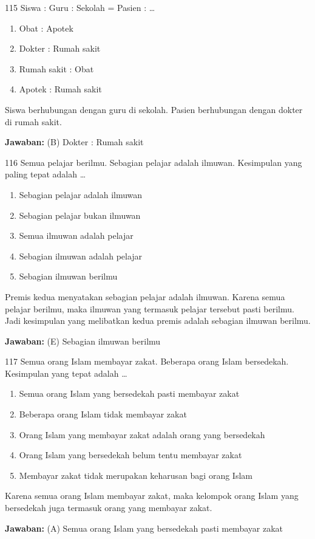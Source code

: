 \documentclass[11pt]{article}
\newenvironment{pil}{\begin{enumerate}[label=(\Alph*),leftmargin=*,itemsep=1pt,topsep=3pt]}{\end{enumerate}}
\newcommand{\jw}[1]{\par\smallskip\begin{jawbox}\textbf{Jawaban:} #1\end{jawbox}}
\begin{document}
\begin{soalbox}{1}{15}
Siswa : Guru : Sekolah = Pasien : \ldots
\begin{pil}\item Obat : Apotek \item Dokter : Rumah sakit \item Rumah sakit : Obat \item Apotek : Rumah sakit\end{pil}
\end{soalbox}
\begin{pembox}
Siswa berhubungan dengan guru di sekolah. Pasien berhubungan dengan dokter di rumah sakit.
\jw{(B) Dokter : Rumah sakit}
\end{pembox}

\begin{soalbox}{1}{16}
Semua pelajar berilmu. Sebagian pelajar adalah ilmuwan. Kesimpulan yang paling tepat adalah \ldots
\begin{pil}\item Sebagian pelajar adalah ilmuwan \item Sebagian pelajar bukan ilmuwan \item Semua ilmuwan adalah pelajar \item Sebagian ilmuwan adalah pelajar \item Sebagian ilmuwan berilmu\end{pil}
\end{soalbox}
\begin{pembox}
Premis kedua menyatakan sebagian pelajar adalah ilmuwan. Karena semua pelajar berilmu, maka ilmuwan yang termasuk pelajar tersebut pasti berilmu. Jadi kesimpulan yang melibatkan kedua premis adalah sebagian ilmuwan berilmu.
\jw{(E) Sebagian ilmuwan berilmu}
\end{pembox}

\begin{soalbox}{1}{17}
Semua orang Islam membayar zakat. Beberapa orang Islam bersedekah. Kesimpulan yang tepat adalah \ldots
\begin{pil}\item Semua orang Islam yang bersedekah pasti membayar zakat \item Beberapa orang Islam tidak membayar zakat \item Orang Islam yang membayar zakat adalah orang yang bersedekah \item Orang Islam yang bersedekah belum tentu membayar zakat \item Membayar zakat tidak merupakan keharusan bagi orang Islam\end{pil}
\end{soalbox}
\begin{pembox}
Karena semua orang Islam membayar zakat, maka kelompok orang Islam yang bersedekah juga termasuk orang yang membayar zakat.
\jw{(A) Semua orang Islam yang bersedekah pasti membayar zakat}
\end{pembox}
\end{document}
